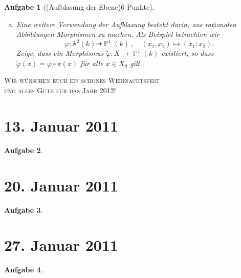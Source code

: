 \documentclass[a4paper, 12pt, numbers=noendperiod, chapterprefix=true]{scrbook}
\theoremstyle{break}
\newtheorem{Aufg}{Aufgabe}
\theoremstyle{nonumberbreak}
\theoremstyle{nonumberplain}
\newcommand{\A}{\mathbb{A}}
\newcommand{\Affine}{\mathbb{A}} %
\DeclareMathOperator{\Projective}{\mathbb{P}} %
\begin{document}
\begin{Aufg}[(Aufblasung der Ebene)6 Punkte]
\begin{enumerate}[a)]
	Zeige, dass sich die strikten Transformierten der $x$- und der $y$-Achse in $X$ nicht mehr schneiden.
	\item Eine weitere Verwendung der Aufblasung besteht darin, aus rationalen Abbildungen Morphismen zu machen. Als Beispiel betrachten wir
		\[\varphi:\Affine^2(k) \dashrightarrow \Projective^1(k)\ , \quad (x_1,x_2) \mapsto (x_1:x_2).\]
	Zeige, dass ein Morphismus $\tilde\varphi: X\to \Projective^1(k)$ existiert, so dass $\tilde\varphi(x) = \varphi\circ \pi(x)$ für alle $x\in X_0$ gilt.
\end{enumerate}\end{Aufg}

\begin{center}

\vspace{5mm}
\textsc{\Large Wir wünschen euch ein schönes Weihnachtsfest \\[1ex]
und alles Gute für das Jahr 2012!
}
\end{center}

\newpage
\section{13. Januar 2011}
\setcounter{Aufg}{0}
\setcounter{Loes}{0}

\begin{Aufg}

\end{Aufg}

\newpage
\section{20. Januar 2011}
\setcounter{Aufg}{0}
\setcounter{Loes}{0}

\begin{Aufg}

\end{Aufg}

\newpage
\section{27. Januar 2011}
\setcounter{Aufg}{0}
\setcounter{Loes}{0}

\begin{Aufg}

\end{Aufg}
\end{document}
